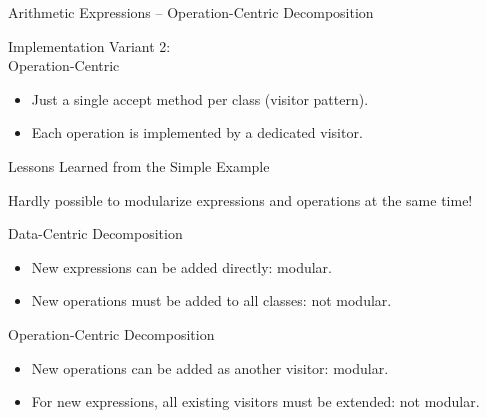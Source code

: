 \begin{frame}{Arithmetic Expressions -- Operation-Centric Decomposition}
	\begin{fancycolumns}[widths={40}]
		\begin{definition}{Implementation Variant 2:\\Operation-Centric}
			\begin{itemize}
				\item Just a single accept method per class (visitor pattern).
				\item Each operation is implemented by a dedicated visitor.				
			\end{itemize}
		\end{definition}
	\nextcolumn
		\begin{exampletight}{}
		\end{exampletight}
	\end{fancycolumns}
\end{frame}

\begin{frame}{Lessons Learned from the Simple Example}
	\begin{note}{}
		Hardly possible to modularize expressions and operations at the same time!
	\end{note}
	\pause
	\begin{fancycolumns}
		\begin{note}{Data-Centric Decomposition}
			\begin{itemize}
				\item New expressions can be added directly: modular.
				\item New operations must be added to all classes: not modular.
			\end{itemize}
		\end{note}
	\nextcolumn
		\begin{note}{Operation-Centric Decomposition}
			\begin{itemize}
				\item New operations can be added as another visitor: modular.
				\item For new expressions, all existing visitors must be extended: not modular.
			\end{itemize}
		\end{note}	
	\end{fancycolumns}
\end{frame}